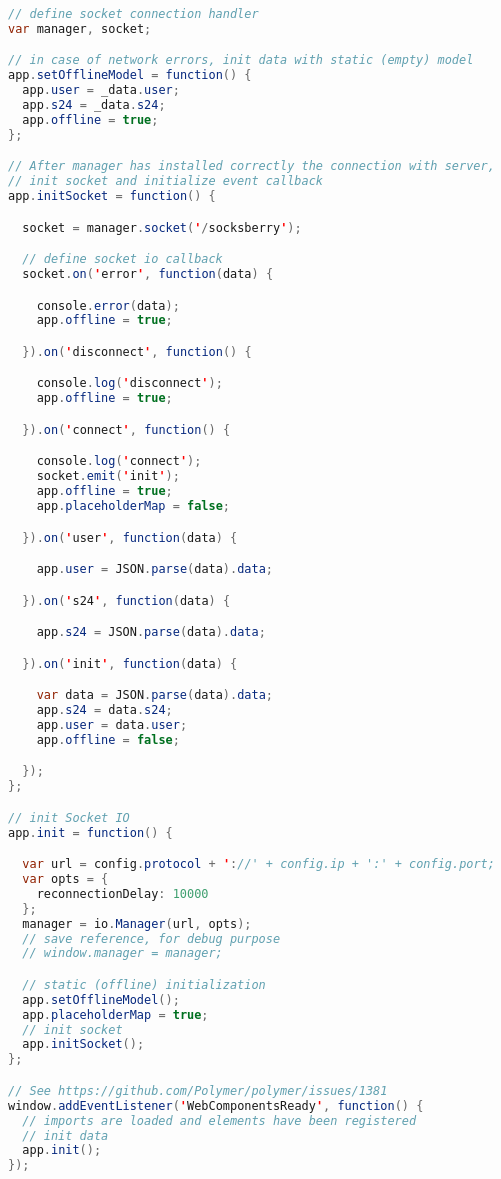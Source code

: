 \begin{lstlisting}[language=java, captionpos=b, caption={HTTP WebSocket subscriber}, basicstyle=\scriptsize\ttfamily]
// define socket connection handler
var manager, socket;

// in case of network errors, init data with static (empty) model
app.setOfflineModel = function() {
  app.user = _data.user;
  app.s24 = _data.s24;
  app.offline = true;
};

// After manager has installed correctly the connection with server,
// init socket and initialize event callback
app.initSocket = function() {

  socket = manager.socket('/socksberry');

  // define socket io callback
  socket.on('error', function(data) {

    console.error(data);
    app.offline = true;

  }).on('disconnect', function() {

    console.log('disconnect');
    app.offline = true;

  }).on('connect', function() {

    console.log('connect');
    socket.emit('init');
    app.offline = true;
    app.placeholderMap = false;

  }).on('user', function(data) {

    app.user = JSON.parse(data).data;

  }).on('s24', function(data) {

    app.s24 = JSON.parse(data).data;

  }).on('init', function(data) {

    var data = JSON.parse(data).data;
    app.s24 = data.s24;
    app.user = data.user;
    app.offline = false;

  });
};

// init Socket IO
app.init = function() {

  var url = config.protocol + '://' + config.ip + ':' + config.port;
  var opts = {
    reconnectionDelay: 10000
  };
  manager = io.Manager(url, opts);
  // save reference, for debug purpose
  // window.manager = manager;

  // static (offline) initialization
  app.setOfflineModel();
  app.placeholderMap = true;
  // init socket
  app.initSocket();
};

// See https://github.com/Polymer/polymer/issues/1381
window.addEventListener('WebComponentsReady', function() {
  // imports are loaded and elements have been registered
  // init data
  app.init();
});
\end{lstlisting}
